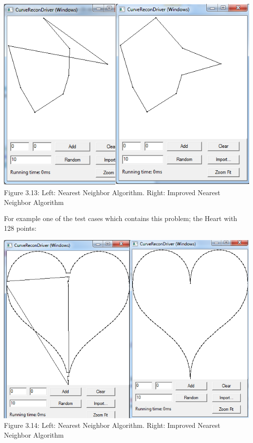           \begin{center}
            \includegraphics[scale = 0.5]{3ImprovedNearestNeighbor/innPointCirkel.png}\\
            Figure 3.13: Left: Nearest Neighbor Algorithm. Right: Improved Nearest Neighbor Algorithm
            \label{fig:inn_pointcircle}
          \end{center}
\newpage
   \noindent For example one of the test cases which contains this problem; the Heart with 128 points:\\
          \begin{center}
            \includegraphics[scale = 0.4]{3ImprovedNearestNeighbor/innHeart.png}\\
            Figure 3.14: Left: Nearest Neighbor Algorithm. Right: Improved Nearest Neighbor Algorithm
            \label{fig:inn_pointcircle}
          \end{center}

